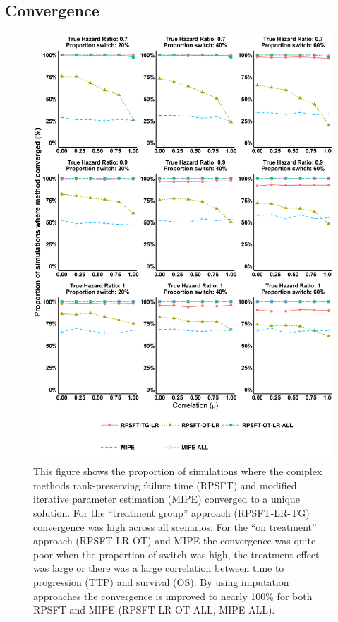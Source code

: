 \subsection{Convergence}
\begin{figure}[h!]
\centering
\includegraphics[width=13cm]{images/chap_sim2/complex_conv.png}
\caption{\label{F:chap_sim2:comp_conv} This figure shows the proportion of simulations where the complex methods rank-preserving failure time (RPSFT) and modified iterative parameter estimation (MIPE) converged to a unique solution. For the ``treatment group'' approach (RPSFT-LR-TG) convergence was high across all scenarios. For the ``on treatment'' approach (RPSFT-LR-OT) and MIPE the convergence was quite poor when the proportion of switch was high, the treatment effect was large or there was a large correlation between time to progression (TTP) and survival (OS). By using imputation approaches the convergence is improved to nearly 100\% for both RPSFT and MIPE (RPSFT-LR-OT-ALL, MIPE-ALL).}
\end{figure}

